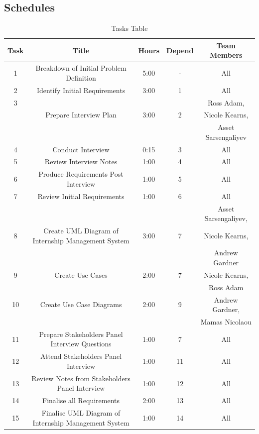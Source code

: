 \documentclass{l3deliverable}
\begin{document}
{%

\subsection{Schedules}

\begin{table}
\caption{Tasks Table} %
\begin{tabular}{|c |c |c |c |c |} %
\hline\hline                        %
Task & Title & Hours & Depend & Team Members \\ [0.5ex]
\hline1 & Breakdown of Initial Problem Definition & 5:00 &-& All\\ %
\hline2 &Identify Initial Requirements & 3:00 & 1 & All\\
\hline3 & &  & & Ross Adam, \\
 &  Prepare Interview Plan&3:00 &2 &Nicole Kearns, \\
 & & & &Asset Sarsengaliyev \\
\hline4 & Conduct Interview & 0:15 &3& All\\
\hline5 & Review Interview Notes& 1:00 &4& All\\
\hline6 & Produce Requirements Post Interview & 1:00 &5& All\\
\hline7 & Review Initial Requirements & 1:00 &6& All \\
\hline &  &  & &Asset Sarsengaliyev, \\
8&Create UML Diagram of Internship Management System&3:00 &7 &Nicole Kearns,  \\
& & & & Andrew Gardner \\
\hline9  & Create Use Cases & 2:00&7 &Nicole Kearns,\\
 & & & & Ross Adam \\
\hline10  & Create Use Case Diagrams &2:00 &9 &  Andrew Gardner, \\
 & & & & Mamas Nicolaou \\
\hline11 & Prepare Stakeholders Panel Interview Questions & 1:00 &7& All\\
\hline12 & Attend Stakeholders Panel Interview & 1:00 &11& All\\
\hline13 & Review Notes from Stakeholders Panel Interview & 1:00 &12& All\\
\hline14 & Finalise all Requirements & 2:00 &13& All\\
\hline15 & Finalise UML Diagram of Internship Management System & 1:00 &14& All\\

\end{tabular}
\end{table}}
\end{document}
